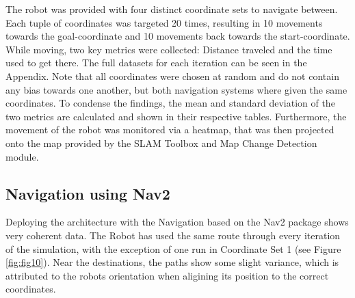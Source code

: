 \documentclass[%
paper=A4,               %
twoside=true,           %
openright,              %
11pt,                   %
bibliography=totoc,     %
titlepage=on,           %
DIV=12,                 %
BCOR=1.5cm,             %
parskip=half,            %
final
]{scrreprt}
\begin{document}
	
	The robot was provided with four distinct coordinate sets to navigate between. Each tuple of coordinates was targeted 20 times, resulting in 10 movements towards the goal-coordinate and 10 movements back towards the start-coordinate. While moving, two key metrics were collected: Distance traveled and the time used to get there. The full datasets for each iteration can be seen in the Appendix. Note that all coordinates were chosen at random and do not contain any bias towards one another, but both navigation systems where given the same coordinates. 
	To condense the findings, the mean and standard deviation of the two metrics are calculated and shown in their respective tables. Furthermore, the movement of the robot was monitored via a heatmap, that was then projected onto the map provided by the SLAM Toolbox and Map Change Detection module.
	
	\subsection{Navigation using Nav2}
	Deploying the architecture with the Navigation based on the Nav2 package shows very coherent data. The Robot has used the same route through every iteration of the simulation, with the exception of one run in Coordinate Set 1 (see Figure \ref{fig:fig10}). Near the destinations, the paths show some slight variance, which is attributed to the robots orientation when aligining its position to the correct coordinates. 
	
\end{document}
